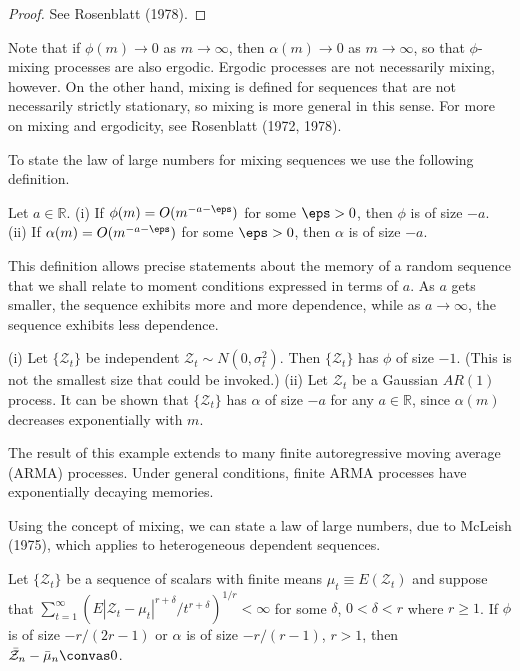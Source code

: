 \begin{proof}
See Rosenblatt (1978). \qedhere
\end{proof}

Note that if $\phi(m) \to 0$ as $m \to \infty$, then $\alpha(m) \to 0$ as $m \to \infty$, so that $\phi$-mixing processes are also ergodic. Ergodic processes are not necessarily mixing, however. On the other hand, mixing is defined for sequences that are not necessarily strictly stationary, so mixing is more general in this sense. For more on mixing and ergodicity, see Rosenblatt (1972, 1978).

To state the law of large numbers for mixing sequences we use the following definition.

\begin{definition}\label{def:mixing-size}
Let $a \in \mathbb{R}$. (i) If $\phi(m) = O(m^{-a-\eps})$ for some $\eps > 0$, then $\phi$ is of size $-a$. (ii) If $\alpha(m) = O(m^{-a-\eps})$ for some $\eps > 0$, then $\alpha$ is of size $-a$.
\end{definition}

This definition allows precise statements about the memory of a random sequence that we shall relate to moment conditions expressed in terms of $a$. As $a$ gets smaller, the sequence exhibits more and more dependence, while as $a \to \infty$, the sequence exhibits less dependence.

\begin{example}\label{ex:mixing-size}
(i) Let $\{\mathcal{Z}_t\}$ be independent $\mathcal{Z}_t \sim N(0, \sigma_t^2)$. Then $\{\mathcal{Z}_t\}$ has $\phi$ of size $-1$. (This is not the smallest size that could be invoked.) (ii) Let $\mathcal{Z}_t$ be a Gaussian $AR(1)$ process. It can be shown that $\{\mathcal{Z}_t\}$ has $\alpha$ of size $-a$ for any $a \in \mathbb{R}$, since $\alpha(m)$ decreases exponentially with $m$.
\end{example}

The result of this example extends to many finite autoregressive moving average (ARMA) processes. Under general conditions, finite ARMA processes have exponentially decaying memories.

Using the concept of mixing, we can state a law of large numbers, due to McLeish (1975), which applies to heterogeneous dependent sequences.

\begin{theorem}[McLeish]\label{thm:mcleish}
Let $\{\mathcal{Z}_t\}$ be a sequence of scalars with finite means $\mu_t \equiv E(\mathcal{Z}_t)$ and suppose that $\sum_{t=1}^{\infty} (E|\mathcal{Z}_t - \mu_t|^{r+\delta}/t^{r+\delta})^{1/r} < \infty$ for some $\delta$, $0 < \delta < r$ where $r \geq 1$. If $\phi$ is of size $-r/(2r-1)$ or $\alpha$ is of size $-r/(r-1)$, $r > 1$, then $\bar{\mathcal{Z}}_n - \bar{\mu}_n \convas 0$.
\end{theorem}

